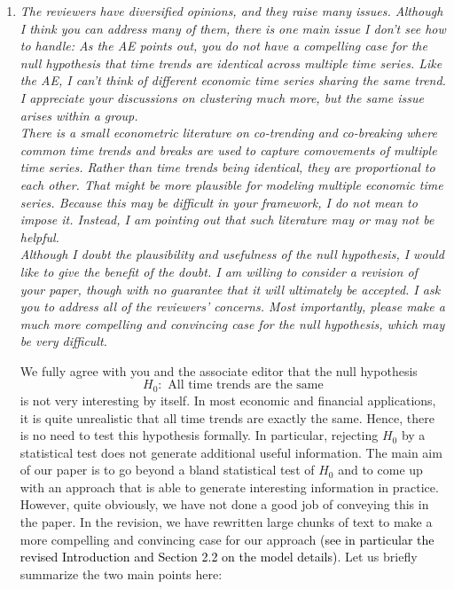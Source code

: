 \documentclass[a4paper,12pt]{article}
\newcommand{\reference}[1]{\textcolor{black}{#1}}
\begin{document}
\begin{enumerate}[label=\arabic*.,leftmargin=0.6cm]


\item \textit{The reviewers have diversified opinions, and they raise many issues. Although I think you can address many of them, there is one main issue I don’t see how to handle: As the AE points out, you do not have a compelling case for the null hypothesis that time trends are identical across multiple time series. Like the AE, I can’t think of different economic time series sharing the same trend.  I appreciate your discussions on clustering much more, but the same issue arises within a group. \\
There is a small econometric literature on co-trending and co-breaking where common time trends and breaks are used to capture comovements of multiple time series. Rather than time trends being identical, they are proportional to each other. That might be more plausible for modeling multiple economic time series. Because this may be difficult in your framework, I do not mean to impose it.  Instead, I am pointing out that such literature may or may not be helpful. \\
Although I doubt the plausibility and usefulness of the null hypothesis, I would like to give the benefit of the doubt. I am willing to consider a revision of your paper, though with no guarantee that it will ultimately be accepted. I ask you to address all of the reviewers' concerns. Most importantly, please make a much more compelling and convincing case for the null hypothesis, which may be very difficult. %
}

We fully agree with you and the associate editor that the null hypothesis
\[ H_0: \text{ All time trends are the same} \]
is not very interesting by itself. In most economic and financial applications, it is quite unrealistic that all time trends are exactly the same. Hence, there is no need to test this hypothesis formally. In particular, rejecting $H_0$ by a statistical test does not generate additional useful information. \newline
The main aim of our paper is to go beyond a bland statistical test of $H_0$ and to come up with an approach that is able to generate interesting information in practice. However, quite obviously, we have not done a good job of conveying this in the paper. In the revision, we have rewritten large chunks of text to make a more compelling and convincing case for our approach \reference{(see in particular the revised Introduction and Section 2.2 on the model details)}. Let us briefly summarize the two main points here: 


\end{enumerate}
\end{document}
